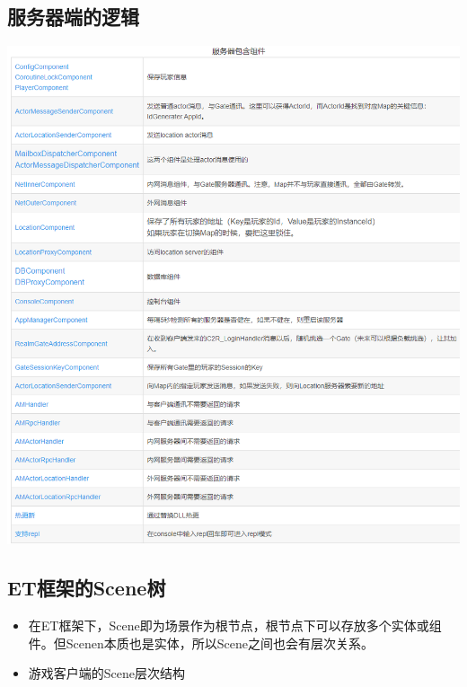 \documentclass[9pt, b5paper]{article}
\begin{document}
\subsection{服务器端的逻辑}
\label{sec-2-3}

\includegraphics[width=.9\linewidth]{./pic/readme_20230131_221134.png}
\subsection{ET框架的Scene树}
\label{sec-2-4}
\begin{itemize}
\item 在ET框架下，Scene即为场景作为根节点，根节点下可以存放多个实体或组件。但Scenen本质也是实体，所以Scene之间也会有层次关系。
\item 游戏客户端的Scene层次结构
\end{itemize}
\end{document}
